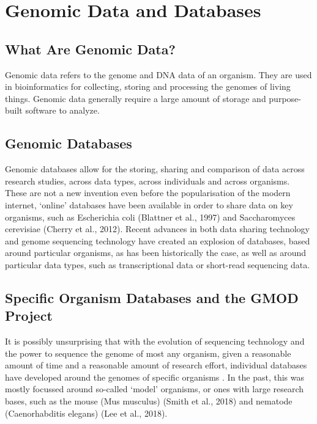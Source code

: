 \chapter{Genomic Data and Databases}\label{ch:ch2}

\section{What Are Genomic Data?}
Genomic data refers to the genome and DNA data of an organism. They are used in bioinformatics for collecting, storing and processing the genomes of living things. Genomic data generally require a large amount of storage and purpose-built software to analyze.


\section{Genomic Databases}
Genomic databases allow for the storing, sharing and comparison of data across research studies, across data types, across individuals and across organisms. These are not a new invention even before the popularisation of the modern internet, ‘online’ databases have been available in order to share data on key organisms, such as Escherichia coli (Blattner et al., 1997) and Saccharomyces cerevisiae (Cherry et al., 2012). Recent advances in both data sharing technology and genome sequencing technology have created an explosion of databases, based around particular organisms, as has been historically the case, as well as around particular data types, such as transcriptional data or short-read sequencing data\cite{gutierrez2019genome}. 

\section{Specific Organism Databases and the GMOD Project} 
It is possibly unsurprising that with the evolution of sequencing technology and the power to sequence the genome of most any organism, given a reasonable amount of time and a reasonable amount of research effort, individual databases have developed around the genomes of specific organisms \cite{ranganathan2018encyclopedia}. In the past, this was mostly focussed around so-called ‘model’ organisms, or ones with large research bases, such as the mouse (Mus musculus) (Smith et al., 2018) and nematode (Caenorhabditis elegans) (Lee et al., 2018).

